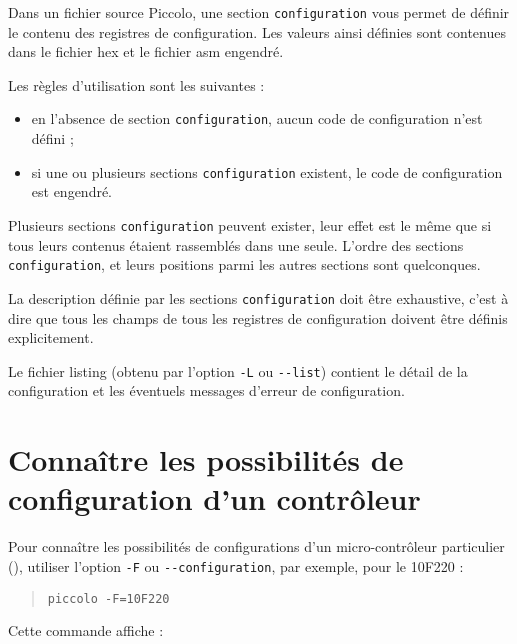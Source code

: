 
\cleardoublepage


\thispagestyle{empty}

Dans un fichier source Piccolo, une section \texttt{configuration} vous permet de définir le contenu des registres de configuration. Les valeurs ainsi définies sont contenues dans le fichier hex et le fichier asm engendré.


Les règles d'utilisation sont les suivantes :
\begin{itemize}
  \item en l’absence de section \texttt{configuration}, aucun code de configuration n’est défini ;
  \item si une ou plusieurs sections \texttt{configuration} existent, le code de configuration est engendré.
\end{itemize}

Plusieurs sections \texttt{configuration} peuvent exister, leur effet est le même que si tous leurs contenus étaient rassemblés dans une seule. L’ordre des sections \texttt{configuration}, et leurs positions parmi les autres sections sont quelconques.

La description définie par les sections \texttt{configuration} doit être exhaustive, c’est à dire que tous les champs de tous les registres de configuration doivent être définis explicitement.

Le fichier listing (obtenu par l’option \texttt{-L} ou \texttt{-{}-list}) contient le détail de la configuration et les éventuels messages d’erreur de configuration.




\section{Connaître les possibilités de configuration d'un contrôleur}

Pour connaître les possibilités de configurations d’un micro-contrôleur particulier (), utiliser l’option \texttt{-F} ou \texttt{-{}-configuration}, par exemple, pour le 10F220 :
\begin{quote}
\texttt{piccolo -F=10F220}
\end{quote}

Cette commande affiche :
{\footnotesize }

